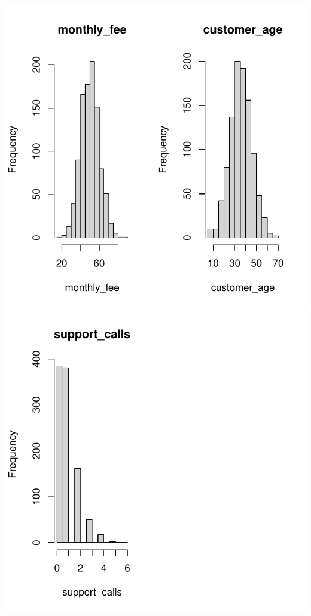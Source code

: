\documentclass[
]{article}
\begin{document}
\includegraphics{3_logistic_regression_files/figure-latex/visualization_histogram-1.pdf}
\includegraphics{3_logistic_regression_files/figure-latex/visualization_histogram-2.pdf}
\end{document}
